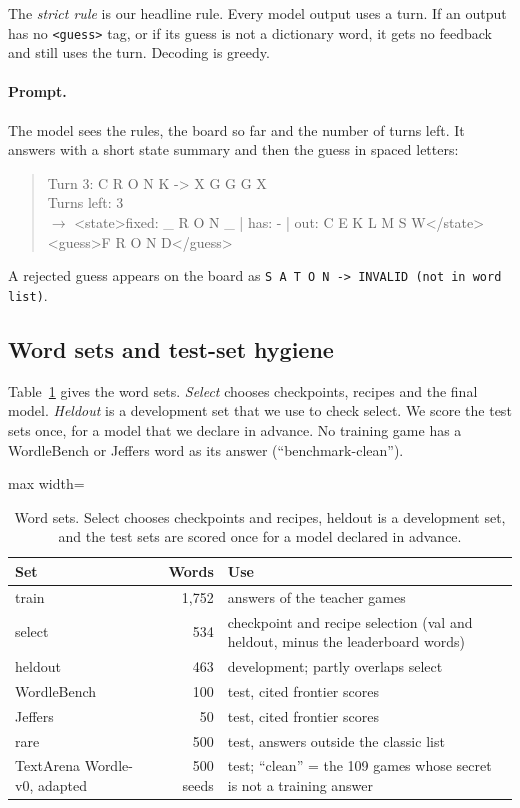 \documentclass{article}
\begin{document}
The \emph{strict rule} is our headline rule.
Every model output uses a turn.
If an output has no \texttt{<guess>} tag, or if its guess is not a dictionary word, it gets no feedback and still uses the turn.
Decoding is greedy.

\paragraph{Prompt.} The model sees the rules, the board so far and the number of turns left. It answers with a short state summary and then the guess in spaced letters:
\begin{quote}\small\ttfamily
Turn 3: C R O N K -> X G G G X\\
Turns left: 3\\
$\to$ <state>fixed: \_ R O N \_ | has: - | out: C E K L M S W</state>\\
\phantom{$\to$ }<guess>F R O N D</guess>
\end{quote}
A rejected guess appears on the board as \texttt{S A T O N -> INVALID (not in word list)}.

\subsection{Word sets and test-set hygiene}
Table~\ref{tab:splits} gives the word sets.
\emph{Select} chooses checkpoints, recipes and the final model.
\emph{Heldout} is a development set that we use to check select.
We score the test sets once, for a model that we declare in advance.
No training game has a WordleBench or Jeffers word as its answer (``benchmark-clean'').

\begin{table}[htbp]
\centering\small
\caption{Word sets. Select chooses checkpoints and recipes, heldout is a development set, and the test sets are scored once for a model declared in advance.}
\label{tab:splits}
\begin{adjustbox}{max width=\linewidth}
\begin{tabular}{lrl}
\toprule
Set & Words & Use \\
\midrule
train & 1,752 & answers of the teacher games \\
select & 534 & checkpoint and recipe selection (val and heldout, minus the leaderboard words) \\
heldout & 463 & development; partly overlaps select \\
WordleBench \citep{wordlebench} & 100 & test, cited frontier scores \\
Jeffers \citep{jeffers} & 50 & test, cited frontier scores \\
rare & 500 & test, answers outside the classic list \\
TextArena Wordle-v0, adapted & 500 seeds & test; ``clean'' = the 109 games whose secret is not a training answer \\
\bottomrule
\end{tabular}\end{adjustbox}
\end{table}
\end{document}
